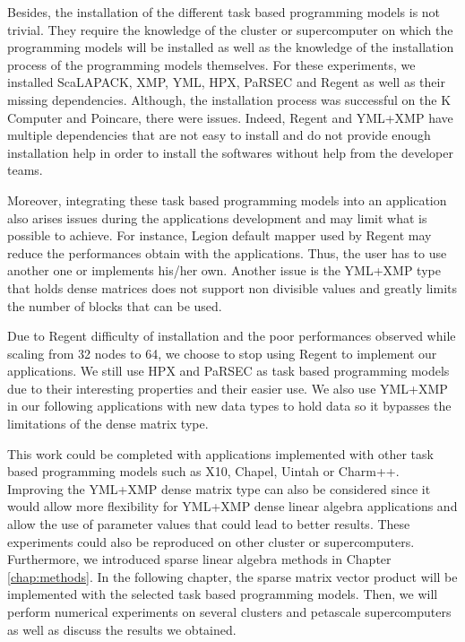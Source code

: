 Besides, the installation of the different task based programming models is not trivial.
They require the knowledge of the cluster or supercomputer on which the programming models will be installed as well as the knowledge of the installation process of the programming models themselves.
For these experiments, we installed ScaLAPACK, XMP, YML, HPX, PaRSEC and Regent as well as their missing dependencies.
Although, the installation process was successful on the K Computer and Poincare, there were issues.
Indeed, Regent and YML+XMP have multiple dependencies that are not easy to install and do not provide enough installation help in order to install the softwares without help from the developer teams.

Moreover, integrating these task based programming models into an application also arises issues during the applications development and may limit what is possible to achieve.
For instance, Legion default mapper used by Regent may reduce the performances obtain with the applications.
Thus, the user has to use another one or implements his/her own.
Another issue is the YML+XMP type that holds dense matrices does not support non divisible values and greatly limits the number of blocks that can be used.

Due to Regent difficulty of installation and the poor performances observed while scaling from 32 nodes to 64, we choose to stop using Regent to implement our applications.
We still use HPX and PaRSEC as task based programming models due to their interesting properties and their easier use.
We also use YML+XMP in our following applications with new data types to hold data so it bypasses the limitations of the dense matrix type.

This work could be completed with applications implemented with other task based programming models such as X10, Chapel, Uintah or Charm++.
Improving the YML+XMP dense matrix type can also be considered since it would allow more flexibility for YML+XMP dense linear algebra applications and allow the use of parameter values that could lead to better results.
These experiments could also be reproduced on other cluster or supercomputers.
Furthermore, we introduced sparse linear algebra methods in Chapter \ref{chap:methods}.
In the following chapter, the sparse matrix vector product will be implemented with the selected task based programming models.
Then, we will perform numerical experiments on several clusters and petascale supercomputers as well as discuss the results we obtained.


